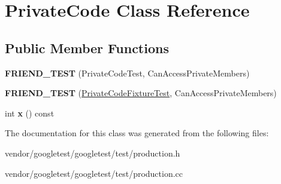 \hypertarget{class_private_code}{}\section{Private\+Code Class Reference}
\label{class_private_code}
\subsection*{Public Member Functions}
\begin{DoxyCompactItemize}
\item 
\mbox{\label{class_private_code_a9a74a333501232539ab1636f0928d8f2}} 
{\bfseries F\+R\+I\+E\+N\+D\+\_\+\+T\+E\+ST} (Private\+Code\+Test, Can\+Access\+Private\+Members)
\item 
\mbox{\label{class_private_code_a29b6823300f68d78691476eeeaed8a7c}} 
{\bfseries F\+R\+I\+E\+N\+D\+\_\+\+T\+E\+ST} (\mbox{\hyperlink{classtesting_1_1_test}{Private\+Code\+Fixture\+Test}}, Can\+Access\+Private\+Members)
\item 
\mbox{\label{class_private_code_a247781246ce4d0c66563eaa39ba5aaa9}} 
int {\bfseries x} () const
\end{DoxyCompactItemize}


The documentation for this class was generated from the following files\+:\begin{DoxyCompactItemize}
\item 
vendor/googletest/googletest/test/production.\+h\item 
vendor/googletest/googletest/test/production.\+cc\end{DoxyCompactItemize}
